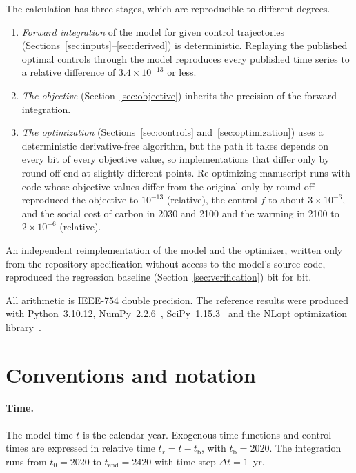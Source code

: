 \documentclass[11pt]{article}
\newcommand{\tb}{t_{\mathrm{b}}}
\begin{document}
The calculation has three stages, which are reproducible to different degrees.
\begin{enumerate}
  \item \emph{Forward integration} of the model for given control trajectories
  (Sections~\ref{sec:inputs}--\ref{sec:derived}) is deterministic. Replaying
  the published optimal controls through the model reproduces every published
  time series to a relative difference of $3.4\times10^{-13}$ or less.
  \item \emph{The objective} (Section~\ref{sec:objective}) inherits the
  precision of the forward integration.
  \item \emph{The optimization} (Sections~\ref{sec:controls}
  and~\ref{sec:optimization}) uses a deterministic derivative-free algorithm,
  but the path it takes depends on every bit of every objective value, so
  implementations that differ only by round-off end at slightly different
  points. Re-optimizing manuscript runs with code whose objective values
  differ from the original only by round-off reproduced the objective to
  $10^{-13}$ (relative), the control $f$ to about $3\times10^{-6}$, and the
  social cost of carbon in 2030 and 2100 and the warming in 2100 to $2\times10^{-6}$
  (relative).
\end{enumerate}
An independent reimplementation of the model and the optimizer, written only
from the repository specification without access to the model's source code,
reproduced the regression baseline (Section~\ref{sec:verification}) bit for
bit.

All arithmetic is IEEE-754 double precision. The reference results were
produced with Python~3.10.12, NumPy~2.2.6~\cite{Harris2020},
SciPy~1.15.3~\cite{Virtanen2020} and the NLopt optimization
library~\cite{NLopt}.

\section{Conventions and notation}
\label{sec:notation}

\paragraph{Time.} The model time $t$ is the calendar year. Exogenous time
functions and control times are expressed in relative time $t_r = t - \tb$,
with $\tb = 2020$. The integration runs from $t_0 = 2020$ to $t_{\mathrm{end}}
= 2420$ with time step $\Delta t = 1$~yr.
\end{document}
